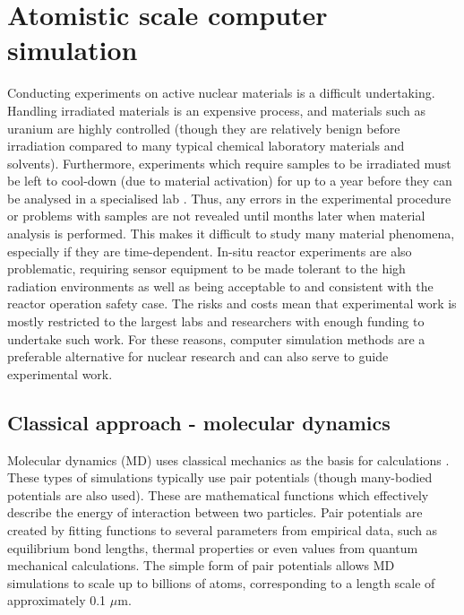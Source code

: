 \section{Atomistic scale computer simulation}

Conducting experiments on active nuclear materials is a difficult undertaking. Handling irradiated materials is an expensive process, and materials such as uranium are highly controlled (though they are relatively benign before irradiation compared to many typical chemical laboratory materials and solvents). Furthermore, experiments which require samples to be irradiated must be left to cool-down (due to material activation) for up to a year before they can be analysed in a specialised lab \cite{efthymiopoulos2011hiradmat}. Thus, any errors in the experimental procedure or problems with samples are not revealed until months later when material analysis is performed. This makes it difficult to study many material phenomena, especially if they are time-dependent. In-situ reactor experiments are also problematic, requiring sensor equipment to be made tolerant to the high radiation environments as well as being acceptable to and consistent with the reactor operation safety case. The risks and costs mean that experimental work is mostly restricted to the largest labs and researchers with enough funding to undertake such work. For these reasons, computer simulation methods are a preferable alternative for nuclear research and can also serve to guide experimental work.

\subsection{Classical approach - molecular dynamics}

Molecular dynamics (MD) uses classical mechanics as the basis for calculations \cite{Andersen1980}. These types of simulations typically use pair potentials (though many-bodied potentials are also used). These are mathematical functions which effectively describe the energy of interaction between two particles. Pair potentials are created by fitting functions to several parameters from empirical data, such as equilibrium bond lengths, thermal properties or even values from quantum mechanical calculations. The simple form of pair potentials allows MD simulations to scale up to billions of atoms, corresponding to a length scale of approximately 0.1 $\mu$m. 

